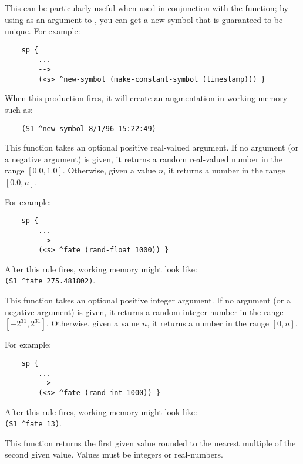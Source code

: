\begin{description}
	This can be particularly useful when used in conjunction with the  function; by using  as an argument to , you can get a new symbol that is guaranteed to be unique. For example:

	\begin{verbatim}
	sp {
	    ...
	    -->
	    (<s> ^new-symbol (make-constant-symbol (timestamp))) }
	\end{verbatim}

	When this production fires, it will create an augmentation in working memory such as:

	\begin{verbatim}
	(S1 ^new-symbol 8/1/96-15:22:49)
	\end{verbatim}


\item [\soarb{rand-float} --- ]
	This function takes an optional positive real-valued argument. If no argument (or a negative argument) is given, it returns a random real-valued number in the range $[0.0,1.0]$. Otherwise, given a value $n$, it returns a number in the range $[0.0, n]$.

	For example:

	\begin{verbatim}
	sp {
	    ...
	    -->
	    (<s> ^fate (rand-float 1000)) }
	\end{verbatim}

	After this rule fires, working memory might look like: \\
	\verb|(S1 ^fate 275.481802)|.


\item [\soarb{rand-int} --- ]
	This function takes an optional positive integer argument. If no argument (or a negative argument) is given, it returns a random integer number in the range $[-2^{31}, 2^{31}]$. Otherwise, given a value $n$, it returns a number in the range $[0, n]$.

	For example:

	\begin{verbatim}
	sp {
	    ...
	    -->
	    (<s> ^fate (rand-int 1000)) }
	\end{verbatim}

	After this rule fires, working memory might look like: \\
	\verb|(S1 ^fate 13)|.


\item [\soarb{round-off} --- ]
	This function returns the first given value rounded to the nearest multiple of the second given value. Values must be integers or real-numbers.


\end{description}
